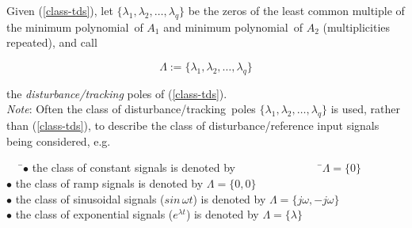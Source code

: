 \documentclass[a4paper]{article}
\theoremstyle{plain} %
{\theorembodyfont{\normalfont}
\newtheorem{Exa}{Example}}
\def\mp{minimum polynomial}
\def\dt{disturbance/tracking}
\begin{document}
Given (\ref{class-tds}), let $\{\lambda_1, \lambda_2, \ldots ,
\lambda_q \}$ be the zeros of the least common multiple of the \mp\
of $A_1$ and \mp\ of $A_2$ (multiplicities repeated), and call

\begin{equation}
  \Lambda := \{\lambda_1, \lambda_2, \ldots ,\lambda_q \}
\end{equation}

the {\em \dt} poles\cite[pp.95--96]{masten1} of (\ref{class-tds}).\\%

{\em Note}: Often the class of \dt\ poles $\{\lambda_1, \lambda_2,
\ldots ,\lambda_q \}$ is used, rather than (\ref{class-tds}), to
describe the class of disturbance/reference input signals being
considered, e.g.

\begin{tabbing}
~~~\=$\bullet$ the class of constant signals is denoted by
~~~~~~~~~~~~~~~\=$\Lambda = \{0\}$ \\%
  \>$\bullet$ the class of ramp signals is denoted by  \>$\Lambda =
  \{0,0\}$ \\%
  \>$\bullet$ the class of sinusoidal signals ($sin \, \omega t$) is
  denoted by  \>$\Lambda = \{j\omega,-j\omega \}$ \\%
  \>$\bullet$ the class of exponential signals ($e^{\lambda t}$) is
  denoted by  \>$\Lambda = \{\lambda\}$ \\%
\end{tabbing}
\end{document}
